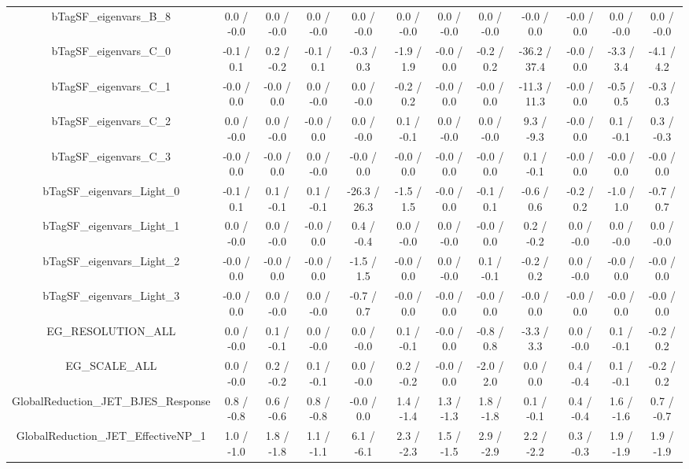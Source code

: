 \begin{table}[htbp]
\begin{center}
\begin{tabular}{|c|c|c|c|c|c|c|c|c|c|c|c|}
  bTagSF_eigenvars_B_8 & 0.0 / -0.0 & 0.0 / -0.0 & 0.0 / -0.0 & 0.0 / -0.0 & 0.0 / -0.0 & 0.0 / -0.0 & 0.0 / -0.0 & -0.0 / 0.0 & -0.0 / 0.0 & 0.0 / -0.0 & 0.0 / -0.0 \\ 
  bTagSF_eigenvars_C_0 & -0.1 / 0.1 & 0.2 / -0.2 & -0.1 / 0.1 & -0.3 / 0.3 & -1.9 / 1.9 & -0.0 / 0.0 & -0.2 / 0.2 & -36.2 / 37.4 & -0.0 / 0.0 & -3.3 / 3.4 & -4.1 / 4.2 \\ 
  bTagSF_eigenvars_C_1 & -0.0 / 0.0 & -0.0 / 0.0 & 0.0 / -0.0 & 0.0 / -0.0 & -0.2 / 0.2 & -0.0 / 0.0 & -0.0 / 0.0 & -11.3 / 11.3 & -0.0 / 0.0 & -0.5 / 0.5 & -0.3 / 0.3 \\ 
  bTagSF_eigenvars_C_2 & 0.0 / -0.0 & 0.0 / -0.0 & -0.0 / 0.0 & 0.0 / -0.0 & 0.1 / -0.1 & 0.0 / -0.0 & 0.0 / -0.0 & 9.3 / -9.3 & -0.0 / 0.0 & 0.1 / -0.1 & 0.3 / -0.3 \\ 
  bTagSF_eigenvars_C_3 & -0.0 / 0.0 & -0.0 / 0.0 & 0.0 / -0.0 & -0.0 / 0.0 & -0.0 / 0.0 & -0.0 / 0.0 & -0.0 / 0.0 & 0.1 / -0.1 & -0.0 / 0.0 & -0.0 / 0.0 & -0.0 / 0.0 \\ 
  bTagSF_eigenvars_Light_0 & -0.1 / 0.1 & 0.1 / -0.1 & 0.1 / -0.1 & -26.3 / 26.3 & -1.5 / 1.5 & -0.0 / 0.0 & -0.1 / 0.1 & -0.6 / 0.6 & -0.2 / 0.2 & -1.0 / 1.0 & -0.7 / 0.7 \\ 
  bTagSF_eigenvars_Light_1 & 0.0 / -0.0 & 0.0 / -0.0 & -0.0 / 0.0 & 0.4 / -0.4 & 0.0 / -0.0 & 0.0 / -0.0 & -0.0 / 0.0 & 0.2 / -0.2 & 0.0 / -0.0 & 0.0 / -0.0 & 0.0 / -0.0 \\ 
  bTagSF_eigenvars_Light_2 & -0.0 / 0.0 & -0.0 / 0.0 & -0.0 / 0.0 & -1.5 / 1.5 & -0.0 / 0.0 & 0.0 / -0.0 & 0.1 / -0.1 & -0.2 / 0.2 & 0.0 / -0.0 & -0.0 / 0.0 & -0.0 / 0.0 \\ 
  bTagSF_eigenvars_Light_3 & -0.0 / 0.0 & 0.0 / -0.0 & 0.0 / -0.0 & -0.7 / 0.7 & -0.0 / 0.0 & -0.0 / 0.0 & -0.0 / 0.0 & -0.0 / 0.0 & -0.0 / 0.0 & -0.0 / 0.0 & -0.0 / 0.0 \\ 
  EG_RESOLUTION_ALL & 0.0 / -0.0 & 0.1 / -0.1 & 0.0 / -0.0 & 0.0 / -0.0 & 0.1 / -0.1 & -0.0 / 0.0 & -0.8 / 0.8 & -3.3 / 3.3 & 0.0 / -0.0 & 0.1 / -0.1 & -0.2 / 0.2 \\ 
  EG_SCALE_ALL & 0.0 / -0.0 & 0.2 / -0.2 & 0.1 / -0.1 & 0.0 / -0.0 & 0.2 / -0.2 & -0.0 / 0.0 & -2.0 / 2.0 & 0.0 / 0.0 & 0.4 / -0.4 & 0.1 / -0.1 & -0.2 / 0.2 \\ 
  GlobalReduction_JET_BJES_Response & 0.8 / -0.8 & 0.6 / -0.6 & 0.8 / -0.8 & -0.0 / 0.0 & 1.4 / -1.4 & 1.3 / -1.3 & 1.8 / -1.8 & 0.1 / -0.1 & 0.4 / -0.4 & 1.6 / -1.6 & 0.7 / -0.7 \\ 
  GlobalReduction_JET_EffectiveNP_1 & 1.0 / -1.0 & 1.8 / -1.8 & 1.1 / -1.1 & 6.1 / -6.1 & 2.3 / -2.3 & 1.5 / -1.5 & 2.9 / -2.9 & 2.2 / -2.2 & 0.3 / -0.3 & 1.9 / -1.9 & 1.9 / -1.9 \\ 

\end{tabular}
\end{center}
\end{table}
